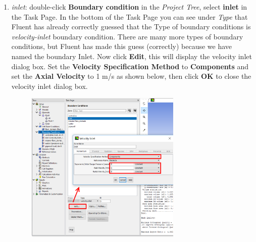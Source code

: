 \documentclass[11pt,a4paper,oneside,hidelinks]{scrartcl}
\newcommand\bfr[1]{\textcolor[rgb]{1,0.00,0.00}{\textbf{\textsf{#1}}}}
\begin{document}
\begin{enumerate}
\item \emph{inlet}: double-click \bfr{Boundary condition} in the \emph{Project Tree}, select \bfr{inlet} in the Task Page. In the bottom of the Task Page you can see under \emph{Type} that Fluent has already correctly guessed that the Type of boundary conditions is \emph{velocity-inlet} boundary condition. There are many more types of boundary conditions, but Fluent has made this guess (correctly) because we have named the boundary Inlet. Now click \bfr{Edit}, this will display the velocity inlet dialog box. Set the \bfr{Velocity Specification Method} to \bfr{Components} and set the \bfr{Axial Velocity} to 1 m/s as shown below, then click \bfr{OK} to close the velocity inlet dialog box.
\begin{figure}[H]
\begin{center}
\includegraphics[width=0.7\textwidth,clip]{BC_velocity_inlet.png}
\end{center}
\end{figure}


\end{enumerate}
\end{document}
